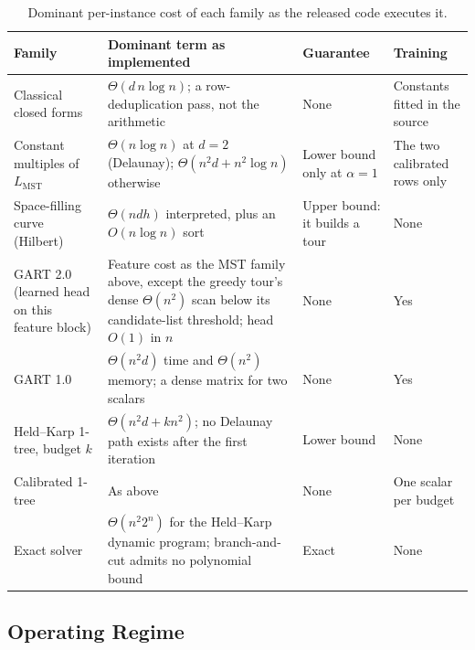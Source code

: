 \documentclass{article}
\begin{document}
\begin{table}[!htbp]
\centering
\caption{Dominant per-instance cost of each family as the released code executes it.}
\label{tab:complexity}
\setlength{\tabcolsep}{4pt}
\renewcommand{\arraystretch}{1.05}
\begin{tabular}{@{}
  >{\footnotesize\raggedright\arraybackslash}p{}
  >{\footnotesize\raggedright\arraybackslash}p{}
  >{\footnotesize\raggedright\arraybackslash}p{}
  >{\footnotesize\raggedright\arraybackslash}p{}@{}}
\toprule
\textbf{Family} & \textbf{Dominant term as implemented} & \textbf{Guarantee} & \textbf{Training} \\
\midrule
Classical closed forms & $\Theta(d\,n\log n)$; a row-deduplication pass, not the arithmetic & None & Constants fitted in the source \\
Constant multiples of $L_{\mathrm{MST}}$ & $\Theta(n\log n)$ at $d=2$ (Delaunay); $\Theta(n^{2}d+n^{2}\log n)$ otherwise & Lower bound only at $\alpha=1$ & The two calibrated rows only \\
Space-filling curve (Hilbert) & $\Theta(n d h)$ interpreted, plus an $O(n\log n)$ sort & Upper bound: it builds a tour & None \\
GART 2.0 (learned head on this feature block) & Feature cost as the MST family above, except the greedy tour's dense $\Theta(n^{2})$ scan below its candidate-list threshold; head $O(1)$ in $n$ & None & Yes \\
GART 1.0 & $\Theta(n^{2}d)$ time and $\Theta(n^{2})$ memory; a dense matrix for two scalars & None & Yes \\
Held--Karp 1-tree, budget $k$ & $\Theta(n^{2}d + k n^{2})$; no Delaunay path exists after the first iteration & Lower bound & None \\
Calibrated 1-tree & As above & None & One scalar per budget \\
Exact solver & $\Theta(n^{2}2^{n})$ for the Held--Karp dynamic program; branch-and-cut admits no polynomial bound & Exact & None \\
\bottomrule
\end{tabular}
\end{table}



\subsection{Operating Regime} \label{subsec:frontier_verdict}
\end{document}
